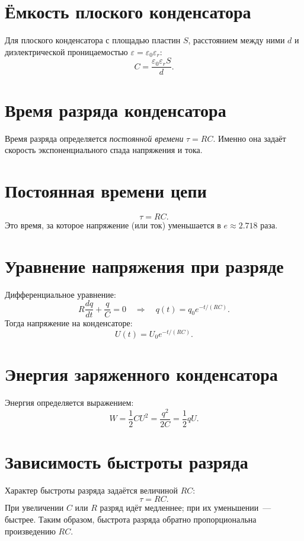 \documentclass[14pt, a4paper, twoside]{extreport}
\begin{document}
\section{Ёмкость плоского конденсатора}
Для плоского конденсатора с площадью пластин $S$, расстоянием между ними $d$ и диэлектрической проницаемостью $\varepsilon = \varepsilon_0 \varepsilon_r$:
\[
  C = \frac{\varepsilon_0 \varepsilon_r S}{d}.
\]

\section{Время разряда конденсатора}
Время разряда определяется \textit{постоянной времени} $\tau = RC$. Именно она задаёт скорость экспоненциального спада напряжения и тока.

\section{Постоянная времени цепи}
\[
  \tau = RC.
\]
Это время, за которое напряжение (или ток) уменьшается в $e \approx 2.718$ раза.

\section{Уравнение напряжения при разряде}
Дифференциальное уравнение:
\[
  R \frac{dq}{dt} + \frac{q}{C} = 0 \quad \Rightarrow \quad q(t) = q_0 e^{-t/(RC)}.
\]
Тогда напряжение на конденсаторе:
\[
  U(t) = U_0 e^{-t/(RC)}.
\]

\section{Энергия заряженного конденсатора}
Энергия определяется выражением:
\[
  W = \frac{1}{2} C U^2 = \frac{q^2}{2C} = \frac{1}{2} qU.
\]

\section{Зависимость быстроты разряда}
Характер быстроты разряда задаётся величиной $RC$:
\[
  \tau = RC.
\]
При увеличении $C$ или $R$ разряд идёт медленнее; при их уменьшении~--- быстрее. Таким образом, быстрота разряда обратно пропорциональна произведению $RC$.

\appendix

\titleformat{\chapter}[block]{\huge\bfseries\centering}{}{0pt}{}
\end{document}
